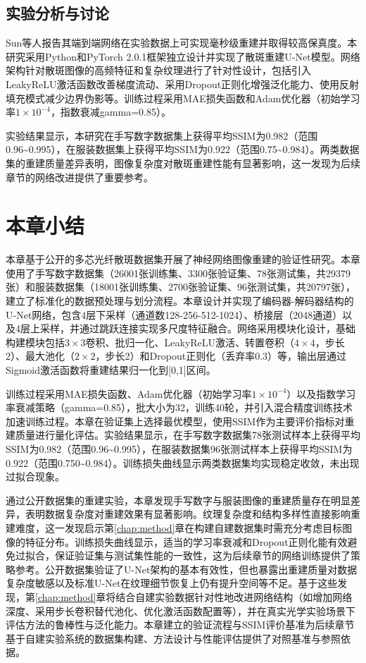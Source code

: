 {\subsection{实验分析与讨论}\label{sec:compare_paper}

Sun等人报告其端到端网络在实验数据上可实现毫秒级重建并取得较高保真度。本研究采用Python和PyTorch 2.0.1框架独立设计并实现了散斑重建U-Net模型。网络架构针对散斑图像的高频特征和复杂纹理进行了针对性设计，包括引入LeakyReLU激活函数改善梯度流动、采用Dropout正则化增强泛化能力、使用反射填充模式减少边界伪影等。训练过程采用MAE损失函数和Adam优化器（初始学习率$1\times 10^{-4}$，指数衰减gamma=0.85）。

实验结果显示，本研究在手写数字数据集上获得平均SSIM为0.982（范围0.96\textasciitilde0.995），在服装数据集上获得平均SSIM为0.922（范围0.75\textasciitilde0.984）。两类数据集的重建质量差异表明，图像复杂度对散斑重建性能有显著影响，这一发现为后续章节的网络改进提供了重要参考。

\section{本章小结}

本章基于公开的多芯光纤散斑数据集开展了神经网络图像重建的验证性研究。本章使用了手写数字数据集（26001张训练集、3300张验证集、78张测试集，共29379张）和服装数据集（18001张训练集、2700张验证集、96张测试集，共20797张），建立了标准化的数据预处理与划分流程。本章设计并实现了编码器-解码器结构的U-Net网络，包含4层下采样（通道数128-256-512-1024）、桥接层（2048通道）以及4层上采样，并通过跳跃连接实现多尺度特征融合。网络采用模块化设计，基础构建模块包括$3\times 3$卷积、批归一化、LeakyReLU激活、转置卷积（$4\times 4$，步长2）、最大池化（$2\times 2$，步长2）和Dropout正则化（丢弃率0.3）等，输出层通过Sigmoid激活函数将重建结果归一化到[0,1]区间。

训练过程采用MAE损失函数、Adam优化器（初始学习率$1\times 10^{-4}$）以及指数学习率衰减策略（gamma=0.85），批大小为32，训练40轮，并引入混合精度训练技术加速训练过程。本章在验证集上选择最优模型，使用SSIM作为主要评价指标对重建质量进行量化评估。实验结果显示，在手写数字数据集78张测试样本上获得平均SSIM为0.982（范围0.96\textasciitilde0.995），在服装数据集96张测试样本上获得平均SSIM为0.922（范围0.750\textasciitilde0.984）。训练损失曲线显示两类数据集均实现稳定收敛，未出现过拟合现象。

通过公开数据集的重建实验，本章发现手写数字与服装图像的重建质量存在明显差异，表明数据复杂度对重建效果有显著影响。纹理复杂度和结构多样性直接影响重建难度，这一发现启示第\ref{chap:method}章在构建自建数据集时需充分考虑目标图像的特征分布。训练损失曲线显示，适当的学习率衰减和Dropout正则化能有效避免过拟合，保证验证集与测试集性能的一致性，这为后续章节的网络训练提供了策略参考。公开数据集验证了U-Net架构的基本有效性，但也暴露出重建质量对数据复杂度敏感以及标准U-Net在纹理细节恢复上仍有提升空间等不足。基于这些发现，第\ref{chap:method}章将结合自建实验数据针对性地改进网络结构（如增加网络深度、采用步长卷积替代池化、优化激活函数配置等），并在真实光学实验场景下评估方法的鲁棒性与泛化能力。本章建立的验证流程与SSIM评价基准为后续章节基于自建实验系统的数据集构建、方法设计与性能评估提供了对照基准与参照依据。

}

